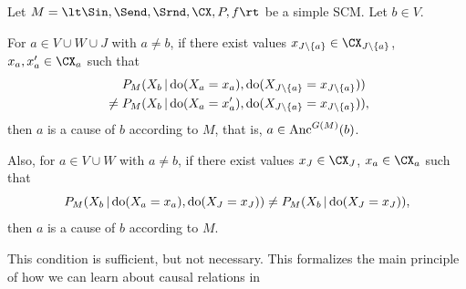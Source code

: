 \begin{Cor}\label{cor:scm_identify_causal_relation}
  Let $M = \lt \Sin, \Send, \Srnd, \CX, P, f \rt$ be a simple SCM.
  Let $b \in V$.

  For $a \in V \cup W \cup J$ with $a \ne b$, if
  there exist values $x_{J\sm\{a\}} \in \CX_{J\sm\{a\}}$, $x_a,x_a' \in \CX_a$ such that
      \begin{equation*}\begin{split}
        & P_{M}(X_b \operatorname*{|} \operatorname{do}(X_a=x_a),\operatorname{do}(X_{J\setminus \{a\}}=x_{J\setminus \{a\}})) \\
        {} \ne {} & P_{M}(X_b \operatorname*{|} \operatorname{do}(X_a=x_a'),\operatorname{do}(X_{J\setminus\{a\}}=x_{J\setminus\{a\}})),
      \end{split}\end{equation*}
  then $a$ is a cause of $b$ according to $M$, that is, $a \in \mathrm{Anc}^{G(M)}(b)$.

  Also, for $a \in V \cup W$ with $a \ne b$, if
  there exist values $x_J \in \CX_J$, $x_a \in \CX_a$ such that
  $$P_{M}(X_b \operatorname*{|} \operatorname{do}(X_a=x_a),\operatorname{do}(X_J=x_J)) \ne P_{M}(X_b \operatorname*{|} \operatorname{do}(X_J=x_J)),$$
  then $a$ is a cause of $b$ according to $M$.  
\end{Cor}
This condition is sufficient, but not necessary.
This formalizes the main principle of how we can learn about causal relations in
